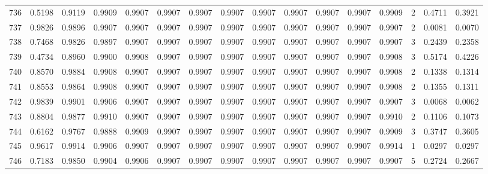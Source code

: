 \begin{tabular}{lrrrrrrrrrrrrrrr}
736 &      0.5198 &  0.9119 &  0.9909 &  0.9907 &  0.9907 &  0.9907 &  0.9907 &  0.9907 &  0.9907 &  0.9907 &   0.9907 &     0.9909 &      2 &                    0.4711 &                     0.3921 \\
737 &      0.9826 &  0.9896 &  0.9907 &  0.9907 &  0.9907 &  0.9907 &  0.9907 &  0.9907 &  0.9907 &  0.9907 &   0.9907 &     0.9907 &      2 &                    0.0081 &                     0.0070 \\
738 &      0.7468 &  0.9826 &  0.9897 &  0.9907 &  0.9907 &  0.9907 &  0.9907 &  0.9907 &  0.9907 &  0.9907 &   0.9907 &     0.9907 &      3 &                    0.2439 &                     0.2358 \\
739 &      0.4734 &  0.8960 &  0.9900 &  0.9908 &  0.9907 &  0.9907 &  0.9907 &  0.9907 &  0.9907 &  0.9907 &   0.9907 &     0.9908 &      3 &                    0.5174 &                     0.4226 \\
740 &      0.8570 &  0.9884 &  0.9908 &  0.9907 &  0.9907 &  0.9907 &  0.9907 &  0.9907 &  0.9907 &  0.9907 &   0.9907 &     0.9908 &      2 &                    0.1338 &                     0.1314 \\
741 &      0.8553 &  0.9864 &  0.9908 &  0.9907 &  0.9907 &  0.9907 &  0.9907 &  0.9907 &  0.9907 &  0.9907 &   0.9907 &     0.9908 &      2 &                    0.1355 &                     0.1311 \\
742 &      0.9839 &  0.9901 &  0.9906 &  0.9907 &  0.9907 &  0.9907 &  0.9907 &  0.9907 &  0.9907 &  0.9907 &   0.9907 &     0.9907 &      3 &                    0.0068 &                     0.0062 \\
743 &      0.8804 &  0.9877 &  0.9910 &  0.9907 &  0.9907 &  0.9907 &  0.9907 &  0.9907 &  0.9907 &  0.9907 &   0.9907 &     0.9910 &      2 &                    0.1106 &                     0.1073 \\
744 &      0.6162 &  0.9767 &  0.9888 &  0.9909 &  0.9907 &  0.9907 &  0.9907 &  0.9907 &  0.9907 &  0.9907 &   0.9907 &     0.9909 &      3 &                    0.3747 &                     0.3605 \\
745 &      0.9617 &  0.9914 &  0.9906 &  0.9907 &  0.9907 &  0.9907 &  0.9907 &  0.9907 &  0.9907 &  0.9907 &   0.9907 &     0.9914 &      1 &                    0.0297 &                     0.0297 \\
746 &      0.7183 &  0.9850 &  0.9904 &  0.9906 &  0.9907 &  0.9907 &  0.9907 &  0.9907 &  0.9907 &  0.9907 &   0.9907 &     0.9907 &      5 &                    0.2724 &                     0.2667 \\

\end{tabular}
